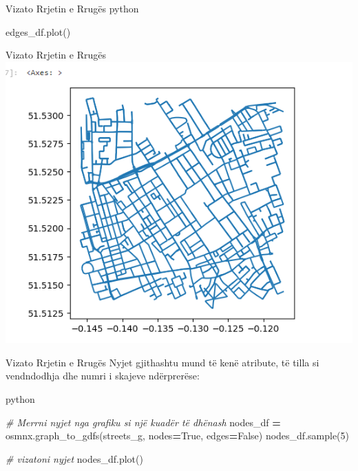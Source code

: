 \documentclass[
  ignorenonframetext,
]{beamer}
\newenvironment{Shaded}{\begin{snugshade}}{\end{snugshade}}
\newcommand{\CommentTok}[1]{\textcolor[rgb]{0.56,0.35,0.01}{\textit{#1}}}
\newcommand{\DecValTok}[1]{\textcolor[rgb]{0.00,0.00,0.81}{#1}}
\newcommand{\NormalTok}[1]{#1}
\newcommand{\OperatorTok}[1]{\textcolor[rgb]{0.81,0.36,0.00}{\textbf{#1}}}
\newcommand{\VariableTok}[1]{\textcolor[rgb]{0.00,0.00,0.00}{#1}}
\begin{document}
\begin{frame}[fragile]{Vizato Rrjetin e Rrugës}
\protect\hypertarget{vizato-rrjetin-e-rruguxebs-6}{}
python

\begin{Shaded}
\begin{Highlighting}[]
\NormalTok{edges\_df.plot()}
\end{Highlighting}
\end{Shaded}
\end{frame}

\begin{frame}{Vizato Rrjetin e Rrugës}
\protect\hypertarget{vizato-rrjetin-e-rruguxebs-7}{}
\includegraphics{./Figs/rrjetirrugor2.png}
\end{frame}

\begin{frame}[fragile]{Vizato Rrjetin e Rrugës}
\protect\hypertarget{vizato-rrjetin-e-rruguxebs-8}{}
Nyjet gjithashtu mund të kenë atribute, të tilla si vendndodhja dhe
numri i skajeve ndërprerëse:

python

\begin{Shaded}
\begin{Highlighting}[]
\CommentTok{\# Merrni nyjet nga grafiku si një kuadër të dhënash}
\NormalTok{nodes\_df }\OperatorTok{=}\NormalTok{ osmnx.graph\_to\_gdfs(streets\_g, nodes}\OperatorTok{=}\VariableTok{True}\NormalTok{, edges}\OperatorTok{=}\VariableTok{False}\NormalTok{)}
\NormalTok{nodes\_df.sample(}\DecValTok{5}\NormalTok{)}

\CommentTok{\# vizatoni nyjet}
\NormalTok{nodes\_df.plot()}
\end{Highlighting}
\end{Shaded}
\end{frame}
\end{document}
